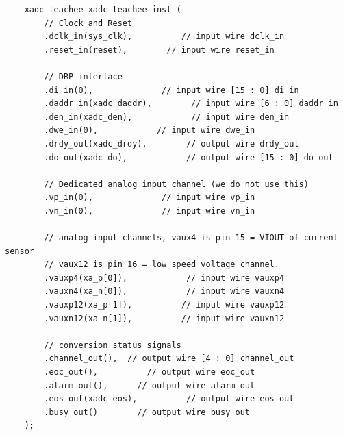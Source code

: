 \documentclass[letterpaper,11pt]{article}
\begin{document}
\begin{verbatim}
    xadc_teachee xadc_teachee_inst (
        // Clock and Reset
        .dclk_in(sys_clk),          // input wire dclk_in
        .reset_in(reset),        // input wire reset_in

        // DRP interface
        .di_in(0),              // input wire [15 : 0] di_in
        .daddr_in(xadc_daddr),        // input wire [6 : 0] daddr_in
        .den_in(xadc_den),            // input wire den_in
        .dwe_in(0),            // input wire dwe_in
        .drdy_out(xadc_drdy),        // output wire drdy_out
        .do_out(xadc_do),            // output wire [15 : 0] do_out

        // Dedicated analog input channel (we do not use this)
        .vp_in(0),              // input wire vp_in
        .vn_in(0),              // input wire vn_in

        // analog input channels, vaux4 is pin 15 = VIOUT of current sensor
        // vaux12 is pin 16 = low speed voltage channel.
        .vauxp4(xa_p[0]),            // input wire vauxp4
        .vauxn4(xa_n[0]),            // input wire vauxn4
        .vauxp12(xa_p[1]),          // input wire vauxp12
        .vauxn12(xa_n[1]),          // input wire vauxn12

        // conversion status signals
        .channel_out(),  // output wire [4 : 0] channel_out
        .eoc_out(),          // output wire eoc_out
        .alarm_out(),      // output wire alarm_out
        .eos_out(xadc_eos),          // output wire eos_out
        .busy_out()        // output wire busy_out
    );
\end{verbatim}
\end{document}
